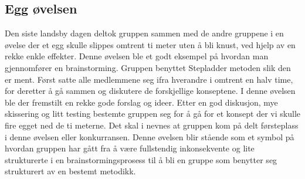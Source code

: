 \subsection{Egg øvelsen}
Den siste landsby dagen deltok gruppen sammen med de andre gruppene i en øvelse der et egg skulle slippes omtrent ti meter uten å bli knust, ved hjelp av en rekke enkle effekter. Denne øvelsen ble et godt eksempel på hvordan man gjennomfører en brainstorming. 
Gruppen benyttet Stepladder metoden slik den er ment. Først satte alle medlemmene seg ifra hverandre i omtrent en halv time, for deretter å gå sammen og diskutere de forskjellige konseptene. I denne øvelsen ble der fremstilt en rekke gode forslag og ideer. Etter en god diskusjon, mye skissering og litt testing bestemte gruppen seg for å gå for et konsept der vi skulle fire egget ned de ti meterne. Det skal i nevnes at gruppen kom på delt førsteplass i denne øvelsen eller konkurransen. 
Denne øvelsen blir stående som et symbol på hvordan gruppen har gått fra å være fullstendig inkonsekvente og lite strukturerte i en brainstormingsprosess til å bli en gruppe som benytter seg strukturert av en bestemt metodikk. 


